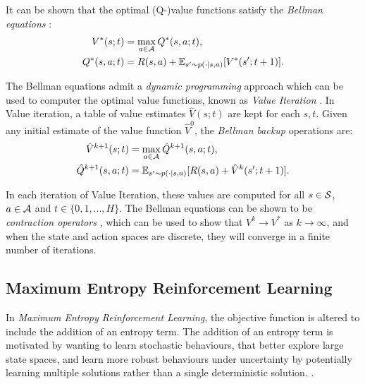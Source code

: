     It can be shown that the optimal (Q-)value functions satisfy the \textit{Bellman equations}  :
    \begin{align}
        V^*(s;t) &= \max_{a\in\mathcal{A}} Q^*(s,a;t), \label{eq:bellman_opt_v} \\
        Q^*(s,a;t) &= R(s,a) + \mathbb{E}_{s'\sim p(\cdot|s,a)} [V^*(s';t+1)]. \label{eq:bellman_opt_q}
    \end{align} 

    The Bellman equations admit a \textit{dynamic programming} approach which can be used to computer the optimal value functions, known as \textit{Value Iteration} . In Value iteration, a table of value estimates $\hat{V}(s;t)$ are kept for each $s,t$. Given any initial estimate of the value function $\hat{V}^{0}$, the \textit{Bellman backup} operations are:
    \begin{align}
        \hat{V}^{k+1}(s;t) &= \max_{a\in\mathcal{A}} \hat{Q}^{k+1}(s,a;t), \label{eq:value_iter_v_backup} \\
        \hat{Q}^{k+1}(s,a;t) &= \mathbb{E}_{s'\sim p(\cdot|s,a)} [R(s,a) + \hat{V}^k(s';t+1)]. \label{eq:value_iter_q_backup}
    \end{align}

    In each iteration of Value Iteration, these values are computed for all $s\in\mathcal{S}$, $a\in\mathcal{A}$ and $t\in\{0,1,...,H\}$. The Bellman equations can be shown to be \textit{contraction operators} , which can be used to show that $V^{k}\rightarrow V^*$ as $k\rightarrow \infty$, and when the state and action spaces are discrete, they will converge in a finite number of iterations. 









    \subsection{Maximum Entropy Reinforcement Learning}
    \label{sec:2-2-1-merl}

        In \textit{Maximum Entropy Reinforcement Learning}, the objective function is altered to include the addition of an entropy term. The addition of an entropy term is motivated by wanting to learn stochastic behaviours, that better explore large state spaces, and learn more robust behaviours under uncertainty by potentially learning multiple solutions rather than a single deterministic solution. \cite{deep_energy_policies}. 
        
